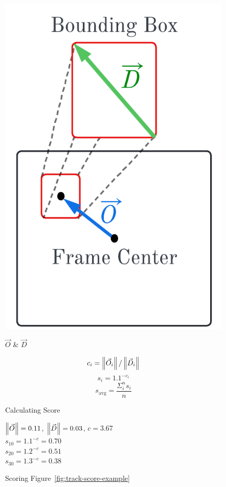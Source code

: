 \begin{figure}
\centering
\begin{minipage}{0.35\linewidth}
\centering
\includegraphics[width=\linewidth]{chapter6/FIGS/fig-tracking-scoring.png}
\caption{\small $\vec{O}$ \& $\vec{D}$}
\label{fig:o-d-calc}
\end{minipage}
\begin{minipage}{0.5\linewidth}
\small
\begin{equation}
	c_i = \left\lVert\vec{O}_i\right\rVert / \left\lVert\vec{D}_i\right\rVert\label{eq:2}
\end{equation}
\begin{equation}
	s_{i} = 1.1^{-c_i}\label{eq:3}
\end{equation}
\begin{equation}
	s_{\text{avg}} = \frac{\Sigma_i^n s_i}{n}\label{eq:4}
\end{equation}
\caption{Calculating Score\\[0.2cm]}
{\centering\small
$\left\lVert\vec{O}\right\rVert = 0.11$, $\left\lVert\vec{D}\right\rVert = 0.03$, $c = 3.67$ \\[0.1in]
$s_{10} = 1.1^{-c} = 0.70$ \\
$s_{20} = 1.2^{-c} = 0.51$ \\
$s_{30} = 1.3^{-c} = 0.38$ \\
}
\caption{Scoring Figure~\ref{fig:track-score-example}}
\label{fig:example-score-calcuclation}
\end{minipage}
\end{figure}

